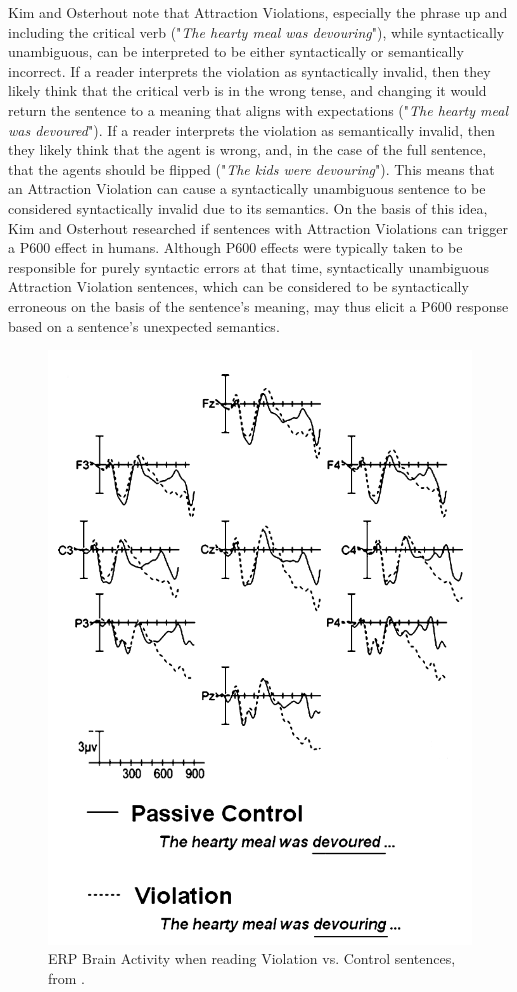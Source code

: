 \documentclass{IEEEtran}
\begin{document}
Kim and Osterhout note that Attraction Violations, especially the phrase up and including the critical verb ("\textit{The hearty meal was devouring}"), while syntactically unambiguous, can be interpreted to be either syntactically or semantically incorrect.
If a reader interprets the violation as syntactically invalid, then they likely think that the critical verb is in the wrong tense, and changing it would return the sentence to a meaning that aligns with expectations ("\textit{The hearty meal was devoured}").
If a reader interprets the violation as semantically invalid, then they likely think that the agent is wrong, and, in the case of the full sentence, that the agents should be flipped ("\textit{The kids were devouring}").
This means that an Attraction Violation can cause a syntactically unambiguous sentence to be considered syntactically invalid due to its semantics.
On the basis of this idea, Kim and Osterhout researched if sentences with Attraction Violations can trigger a P600 effect in humans.
Although P600 effects were typically taken to be responsible for purely syntactic errors at that time, syntactically unambiguous Attraction Violation sentences, which can be considered to be syntactically erroneous on the basis of the sentence's meaning, may thus elicit a P600 response based on a sentence's unexpected semantics.

\begin{figure}
    \centering
    \includegraphics[width=.45\textwidth]{kim_osterhout.png}
    \caption{ERP Brain Activity when reading Violation vs. Control sentences, from \cite{kim2005combinatory}.}
    \label{fig:kim_osterhout}
\end{figure}
\end{document}
